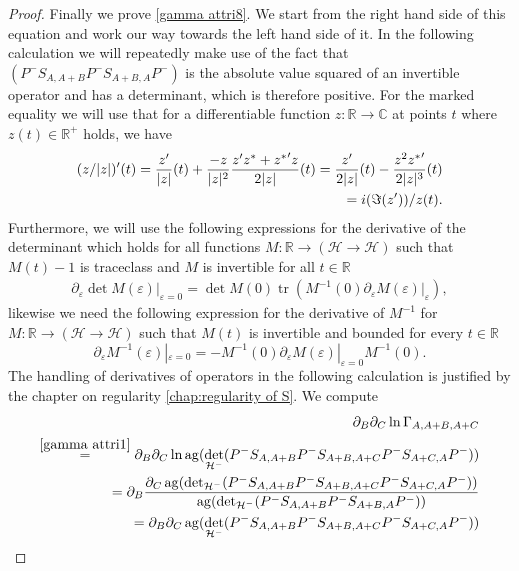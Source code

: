 \documentclass[b5paper,draft,openbib,12pt]{memoir}
\DeclareMathOperator{\tr}{tr}
\DeclareMathOperator{\ag}{ag}
\begin{document}
\begin{proof}
Finally we prove \eqref{gamma attri8}. We start from the right hand side of this equation 
and work our way towards the left hand side of it. In the following calculation we will repeatedly make use of the fact that 
\((P^-S_{A,A+B}P^-S_{A+B,A}P^- )\) is the absolute value squared of an invertible operator and has a determinant, which is therefore positive. 
For the marked equality we will use that for a differentiable function \(z:\mathbb{R}\rightarrow \mathbb{C}\) at points \(t\) where \(z(t)\in\mathbb{R}^+\)
holds, we have
\begin{align}\notag
(z/|z|)'(t)=\frac{z'}{|z|}(t)+\frac{-z}{|z|^2}\frac{z'z^*+ {z^*}'z}{2|z|}(t) =\frac{z'}{2|z|}(t)-\frac{z^2{z^*}'}{2 |z|^3}(t)\\
=i (\Im (z'))/z(t).
\end{align}
Furthermore, we will use the following  expressions for the derivative of the determinant which holds for all functions 
\(M:\mathbb{R}\rightarrow (\mathcal{H}\rightarrow \mathcal{H})\) such that \(M(t)-1\) is traceclass and \(M\) is invertible 
for all \(t\in\mathbb{R}\)
\begin{align}\label{diff det}
\partial_\varepsilon \det M(\varepsilon)|_{\varepsilon=0}=\det M(0) \tr (M^{-1}(0)\partial_\varepsilon M(\varepsilon)|_{\varepsilon}),
\end{align}
likewise we need the following expression for the derivative of \(M^{-1}\) for 
\(M:\mathbb{R}\rightarrow (\mathcal{H}\rightarrow \mathcal{H})\) such that \(M(t)\) is invertible and bounded for every \(t\in\mathbb{R}\)
\begin{equation}
\partial_{\varepsilon}M^{-1}(\varepsilon)|_{\varepsilon=0}=-M^{-1}(0) \partial_{\varepsilon}M(\varepsilon)|_{\varepsilon=0}M^{-1}(0).
\end{equation}
The handling of derivatives of operators in the 
following calculation is justified by 
the chapter on regularity \ref{chap:regularity of S}. 
We compute
\begin{align}
\partial_B \partial_C \ln \Gamma_{A,A+B,A+C}\\
\overset{\eqref{gamma attri1}}{=} 
\partial_B \partial_C \ln \ag(\det_{\mathcal{H}^-} (P^-S_{A,A+B}P^-S_{A+B,A+C}P^- S_{A+C,A}P^-))\\
=\partial_B \frac{\partial_C\ag(\det_{\mathcal{H}^-}(P^-S_{A,A+B}P^-S_{A+B,A+C}P^- S_{A+C,A}P^-))}{\ag(\det_{\mathcal{H}^-} (P^-S_{A,A+B}P^-S_{A+B,A}P^- ))}\\
=\partial_B \partial_C\ag(\det_{\mathcal{H}^-}(P^-S_{A,A+B}P^-S_{A+B,A+C}P^- S_{A+C,A}P^-))\\

\end{align}
\end{proof}
\end{document}
